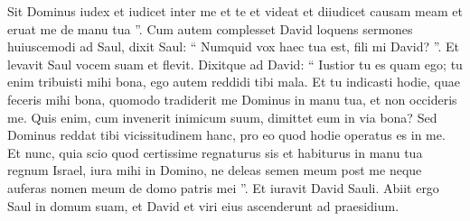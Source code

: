 \begin{biblechapter}
\begin{biblechapter}
\begin{biblechapter}
\begin{biblechapter}
\begin{biblechapter}
\begin{biblechapter}
\begin{biblechapter}
\begin{biblechapter}
\begin{biblechapter}
\begin{biblechapter}
\begin{biblechapter}
\begin{biblechapter}
\begin{biblechapter}
\begin{biblechapter}
\begin{biblechapter}
\begin{biblechapter}
\begin{biblechapter}
\begin{biblechapter}
\begin{biblechapter}
\begin{biblechapter}
\begin{biblechapter}
\begin{biblechapter}
\begin{biblechapter}
\begin{biblechapter}
 \verse Sit Dominus iudex et iudicet inter me et te et videat et diiudicet causam meam et eruat me de manu tua ”. 
\verse Cum autem complesset David loquens sermones huiuscemodi ad Saul, dixit Saul: “ Numquid vox haec tua est, fili mi David? ”. Et levavit Saul vocem suam et flevit. 
\verse Dixitque ad David: “ Iustior tu es quam ego; tu enim tribuisti mihi bona, ego autem reddidi tibi mala. 
\verse Et tu indicasti hodie, quae feceris mihi bona, quomodo tradiderit me Dominus in manu tua, et non occideris me. 
\verse Quis enim, cum invenerit inimicum suum, dimittet eum in via bona? Sed Dominus reddat tibi vicissitudinem hanc, pro eo quod hodie operatus es in me. 
\verse Et nunc, quia scio quod certissime regnaturus sis et habiturus in manu tua regnum Israel, 
\verse iura mihi in Domino, ne deleas semen meum post me neque auferas nomen meum de domo patris mei ”. 
\verse Et iuravit David Sauli. Abiit ergo Saul in domum suam, et David et viri eius ascenderunt ad praesidium.
 

\end{biblechapter}
\end{biblechapter}
\end{biblechapter}
\end{biblechapter}
\end{biblechapter}
\end{biblechapter}
\end{biblechapter}
\end{biblechapter}
\end{biblechapter}
\end{biblechapter}
\end{biblechapter}
\end{biblechapter}
\end{biblechapter}
\end{biblechapter}
\end{biblechapter}
\end{biblechapter}
\end{biblechapter}
\end{biblechapter}
\end{biblechapter}
\end{biblechapter}
\end{biblechapter}
\end{biblechapter}
\end{biblechapter}
\end{biblechapter}
